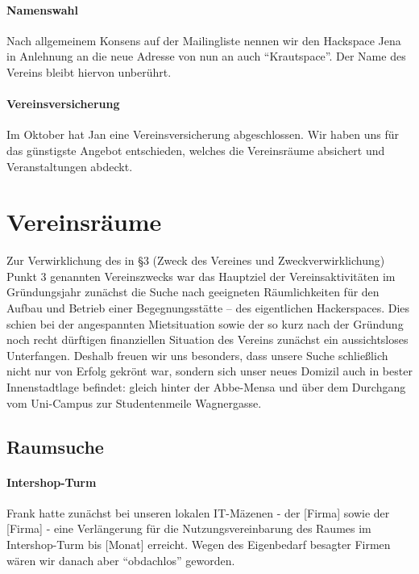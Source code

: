 \documentclass[10pt,DIV16]{scrartcl}
\begin{document}
\paragraph{Namenswahl}

Nach allgemeinem Konsens auf der Mailingliste nennen wir den Hackspace Jena in
Anlehnung an die neue Adresse von nun an auch "`Krautspace"'.  Der Name des
Vereins bleibt hiervon unberührt.

\paragraph{Vereinsversicherung}

Im Oktober hat Jan eine Vereinsversicherung abgeschlossen.  Wir haben uns für
das günstigste Angebot entschieden, welches die Vereinsräume absichert und
Veranstaltungen abdeckt.


\section{Vereinsräume}

Zur Verwirklichung des in §3 (Zweck des Vereines und Zweckverwirklichung)
Punkt 3 genannten Vereinszwecks war das Hauptziel der Vereinsaktivitäten im
Gründungsjahr zunächst die Suche nach geeigneten Räumlichkeiten für den Aufbau
und Betrieb einer Begegnungsstätte -- des eigentlichen Hackerspaces.  Dies
schien bei der angespannten Mietsituation sowie der so kurz nach der Gründung
noch recht dürftigen finanziellen Situation des Vereins zunächst ein
aussichtsloses Unterfangen.  Deshalb freuen wir uns besonders, dass unsere
Suche schließlich nicht nur von Erfolg gekrönt war, sondern sich unser neues
Domizil auch in bester Innenstadtlage befindet:  gleich hinter der Abbe-Mensa
und über dem Durchgang vom Uni-Campus zur Studentenmeile Wagnergasse.

\subsection{Raumsuche}

\paragraph{Intershop-Turm}

Frank hatte zunächst bei unseren lokalen IT-Mäzenen - der [Firma] sowie der
[Firma] - eine Verlängerung für die Nutzungsvereinbarung des Raumes im
Intershop-Turm bis [Monat] erreicht.  Wegen des Eigenbedarf besagter Firmen
wären wir danach aber "`obdachlos"' geworden.
\end{document}
